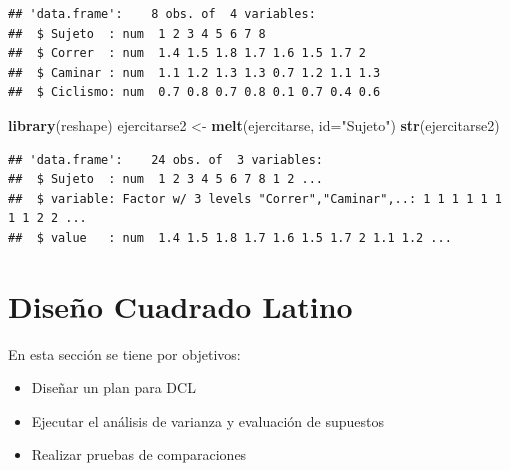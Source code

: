 \documentclass[]{book}
\newenvironment{Shaded}{\begin{snugshade}}{\end{snugshade}}
\newcommand{\KeywordTok}[1]{\textcolor[rgb]{0.13,0.29,0.53}{\textbf{#1}}}
\newcommand{\DataTypeTok}[1]{\textcolor[rgb]{0.13,0.29,0.53}{#1}}
\newcommand{\StringTok}[1]{\textcolor[rgb]{0.31,0.60,0.02}{#1}}
\newcommand{\NormalTok}[1]{#1}
\providecommand{\tightlist}{%
  \setlength{\itemsep}{0pt}\setlength{\parskip}{0pt}}
\begin{document}
\begin{verbatim}
## 'data.frame':    8 obs. of  4 variables:
##  $ Sujeto  : num  1 2 3 4 5 6 7 8
##  $ Correr  : num  1.4 1.5 1.8 1.7 1.6 1.5 1.7 2
##  $ Caminar : num  1.1 1.2 1.3 1.3 0.7 1.2 1.1 1.3
##  $ Ciclismo: num  0.7 0.8 0.7 0.8 0.1 0.7 0.4 0.6
\end{verbatim}

\begin{Shaded}
\begin{Highlighting}[]
\KeywordTok{library}\NormalTok{(reshape)}
\NormalTok{ejercitarse2 <-}\StringTok{ }\KeywordTok{melt}\NormalTok{(ejercitarse, }\DataTypeTok{id=}\StringTok{"Sujeto"}\NormalTok{)}
\KeywordTok{str}\NormalTok{(ejercitarse2)}
\end{Highlighting}
\end{Shaded}

\begin{verbatim}
## 'data.frame':    24 obs. of  3 variables:
##  $ Sujeto  : num  1 2 3 4 5 6 7 8 1 2 ...
##  $ variable: Factor w/ 3 levels "Correr","Caminar",..: 1 1 1 1 1 1 1 1 2 2 ...
##  $ value   : num  1.4 1.5 1.8 1.7 1.6 1.5 1.7 2 1.1 1.2 ...
\end{verbatim}

\chapter{Diseño Cuadrado Latino}\label{diseno-cuadrado-latino}

En esta sección se tiene por objetivos:

\begin{itemize}
\tightlist
\item
  Diseñar un plan para DCL
\item
  Ejecutar el análisis de varianza y evaluación de supuestos
\item
  Realizar pruebas de comparaciones
\end{itemize}
\end{document}
